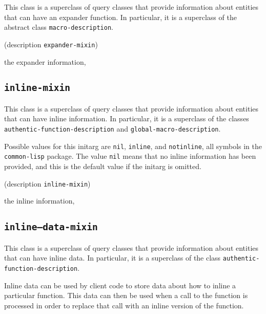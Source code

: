 {\footnotesize
{}
}

This class is a superclass of query classes that provide information
about entities that can have an expander function.  In particular, it is
a superclass of the abstract class \texttt{macro-description}.

{\footnotesize
{}
}

{\footnotesize
{} {(description {\tt expander-mixin})}
}

 the expander information, 

\subsection{\texttt{inline-mixin}}
\label{sec-inline-mixin}

{\footnotesize
{}
}

This class is a superclass of query classes that provide information
about entities that can have inline information.  In particular, it is a
superclass of the classes \texttt{authentic-function-description} and
\texttt{global-macro-description}.

{\footnotesize
{}
}

Possible values for this initarg are \texttt{nil}, \texttt{inline},
and \texttt{notinline}, all symbols in the \texttt{common-lisp}
package.  The value \texttt{nil} means that no inline information has
been provided, and this is the default value if the initarg is omitted.

{\footnotesize
{} {(description {\tt inline-mixin})}
}

 the inline information, 

\subsection{\texttt{inline--data-mixin}}
\label{sec-inline-data-mixin}

{\footnotesize
{}
}

This class is a superclass of query classes that provide information
about entities that can have inline data.  In particular, it is a
superclass of the class \texttt{authentic-function-description}.

Inline data can be used by client code to store data about how to
inline a particular function.  This data can then be used when a call
to the function is processed in order to replace that call with an
inline version of the function.

